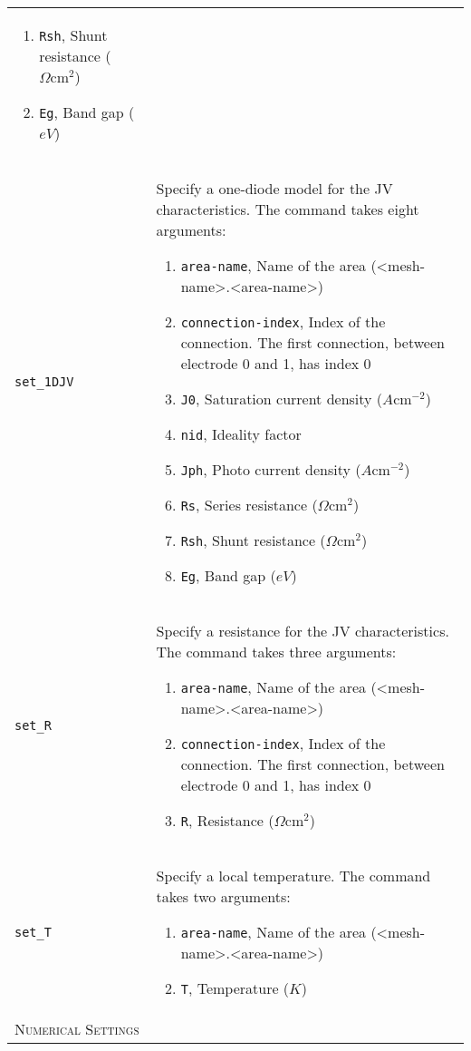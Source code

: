 \documentclass[noshowpacs,preprintnumbers,amsmath,amssymb, letter]{revtex4}
\begin{document}
\begin{longtable}{p{}p{}}
\begin{enumerate}
\item \texttt{Rsh}, Shunt resistance ($\Omega \text{cm}^2$)
\item \texttt{Eg}, Band gap ($eV$)
\end{enumerate}\\
\texttt{set\_1DJV}	&  Specify a one-diode model for the JV characteristics. The command takes eight arguments:
\begin{enumerate}
\item \texttt{area-name}, Name of the area (\textless mesh-name\textgreater .\textless area-name\textgreater )
\item \texttt{connection-index}, Index of the connection. The first connection, between electrode 0 and 1,  has index 0
\item \texttt{J0}, Saturation current density ($A \text{cm}^{-2}$)
\item \texttt{nid}, Ideality factor
\item \texttt{Jph}, Photo current density ($A \text{cm}^{-2}$)
\item \texttt{Rs}, Series resistance ($\Omega \text{cm}^2$)
\item \texttt{Rsh}, Shunt resistance ($\Omega \text{cm}^2$)
\item \texttt{Eg}, Band gap ($eV$)
\end{enumerate}\\
\texttt{set\_R}	&  Specify a resistance for the JV characteristics. The command takes three arguments:
\begin{enumerate}
\item \texttt{area-name}, Name of the area (\textless mesh-name\textgreater .\textless area-name\textgreater )
\item \texttt{connection-index}, Index of the connection. The first connection, between electrode 0 and 1,  has index 0
\item \texttt{R}, Resistance ($\Omega \text{cm}^2$)
\end{enumerate}\\
\texttt{set\_T}	&  Specify a local temperature. The command takes two arguments:
\begin{enumerate}
\item \texttt{area-name}, Name of the area (\textless mesh-name\textgreater .\textless area-name\textgreater )
\item \texttt{T}, Temperature ($K$)
\end{enumerate}\\
\multicolumn{2}{l}{\textsc{Numerical Settings}} \\*

\end{longtable}
\end{document}
